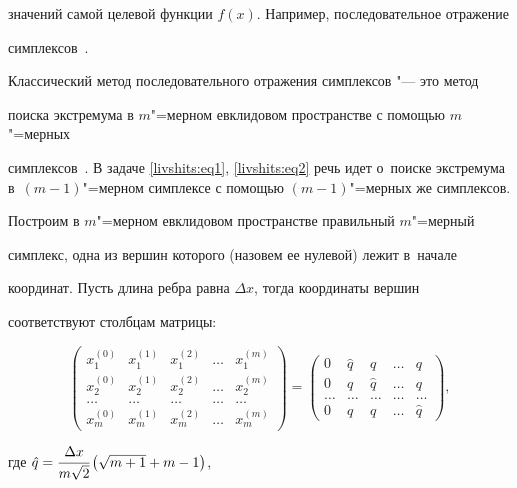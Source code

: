 значений самой целевой функции $f(x)$. Например, последовательное отражение

симплексов~\cite{livsh:bib18}.



Классический метод последовательного отражения симплексов "--- это метод

поиска экстремума в $m$"=мерном евклидовом пространстве с помощью $m$"=мерных

симплексов~\cite{livsh:bib18}. В задаче \eqref{livshits:eq1}, \eqref{livshits:eq2} речь идет о~поиске экстремума \mbox{в~$(m-1)$"=мерном} симплексе с помощью $(m-1)$"=мерных же симплексов.



Построим в $m$"=мерном евклидовом пространстве правильный $m$"=мерный

симплекс, одна из вершин которого (назовем ее нулевой) лежит в~начале

координат. Пусть длина ребра равна $\Delta x$, тогда координаты вершин

соответствуют столбцам матрицы:

\[

\begin{pmatrix}

x_1^{(0)} & x_1^{(1)} & x_1^{(2)} & \ldots & x_1^{(m)} \\

x_2^{(0)} & x_2^{(1)} & x_2^{(2)} & \ldots & x_2^{(m)}  \\

\ldots  & \ldots & \ldots  & \ldots  & \ldots \\

x_m^{(0)} & x_m^{(1)} & x_m^{(2)}  & \ldots & x_m^{(m)}

\end{pmatrix} =

\begin{pmatrix}

 0  & \hat{q} & q & \ldots & q  \\

 0  & q  & \hat{q}  & \ldots & q \\

 \ldots & \ldots & \ldots & \ldots & \ldots \\

 0  & q  & q  &  \ldots  & \hat{q}

\end{pmatrix},

\]

где $\hat{q} =\cfrac{\Delta x}{m\sqrt 2 }\left( \sqrt {m+1} +m-1 \right)$,

